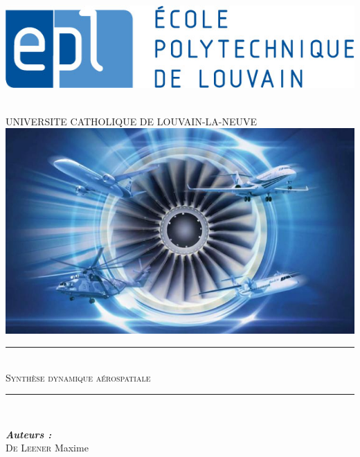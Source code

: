 \begin{titlepage}

\newcommand{\HRule}{\rule{\linewidth}{0.5mm}} %

\center %

\begin{minipage}{0.2\textwidth}
\begin{flushleft} \large
\includegraphics[scale=0.3]{epl-logo.jpg}
\end{flushleft}
\end{minipage}
\begin{minipage}{0.6\textwidth}
\begin{flushright} \large
\end{flushright}
\end{minipage}\\[0.2cm]
{\Large UNIVERSITE CATHOLIQUE DE LOUVAIN-LA-NEUVE}\\[0.1Cm]
\includegraphics[scale=0.5]{1.png}
\HRule \\[0.4cm]
{ \huge \textsc{Synthèse dynamique aérospatiale\\ }} %
\HRule \\[3cm]
 
\begin{minipage}{0.4\textwidth}
\begin{flushleft} \large
\emph{\textbf{Auteurs :}}\\
\textsc{De Leener} Maxime\\ [0,4cm]


\end{flushleft}
\end{minipage}
\end{titlepage}
